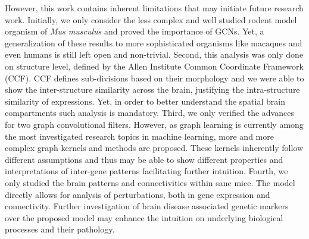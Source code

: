 \documentclass[]{article}
\begin{document}
However, this work contains inherent limitations that may initiate future research work. Initially, we only consider the less complex and well studied rodent model organism of \textit{Mus musculus} and proved the importance of GCNs. Yet, a generalization of these results to more sophisticated organisms like macaques and even humans is still left open and non-trivial. Second, this analysis was only done on structure level, defined by the Allen Institute Common Coordinate Framework (CCF). CCF defines sub-divisions based on their morphology and we were able to show the inter-structure similarity across the brain, justifying the intra-structure similarity of expressions. Yet, in order to better understand the spatial brain compartments such analysis is mandatory.
Third, we only verified the advances for two graph convolutional filters. However, as graph learning is currently among the most investigated research topics in machine learning, more and more complex graph kernels and methods are proposed. These kernels inherently follow different assumptions and thus may be able to show different properties and interpretations of inter-gene patterns facilitating further intuition. 
Fourth, we only studied the brain patterns and connectivities within sane mice. The model directly allows for analysis of perturbations, both in gene expression and connectivity. Further investigation of brain disease associated genetic markers over the proposed model may enhance the intuition on underlying biological processes and their pathology.
\end{document}
